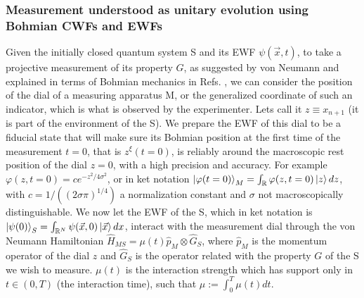 \documentclass[11pt, a4paper]{article} %
\newcommand{\R}{\mathbb{R}} %
\begin{document}

\subsubsection*{Measurement understood as unitary evolution using Bohmian CWFs and EWFs}

Given the initially closed quantum system S and its EWF $\psi(\vec{x},t)$, to take a projective measurement of its property $G$, as suggested by von Neumann \cite{vonNeumann} and explained in terms of Bohmian mechanics in Refs. \cite{Durr, JordiXavier, Holland}, we can consider the position of the dial of a measuring apparatus M, or the generalized coordinate of such an indicator, which is what is observed by the experimenter. Lets call it $z\equiv x_{n+1}$ (it is part of the environment of the S). We prepare the EWF of this dial to be a fiducial state that will make sure its Bohmian position at the first time of the measurement $t=0$, that is $z^\xi(t=0)$, is reliably around the macroscopic rest position of the dial $z=0$, with a high precision and accuracy. For example $\varphi(z,t=0)=c e^{-z^2/4\sigma^2}$, or in ket notation $\ket{\varphi(t=0)}_M=\int_\R\varphi(z,t=0) \ket{z}dz$,  with $c=1/((2\sigma\pi)^{1/4})$ a normalization constant and $\sigma$ not macroscopically distinguishable. We now let the EWF of the S, which in ket notation is $\ket{\psi(0)}_S=\int_{\R^N}\psi(\vec{x},0)\ket{\vec{x}}dx$, interact with the measurement dial through the von Neumann Hamiltonian $\hat{H}_{MS}=\mu(t)\hat{p}_M\otimes \hat{G}_S$, where $\hat{p}_M$ is the momentum operator of the dial $z$ and $\hat{G}_S$ is the operator related with the property $G$ of the S we wish to measure. $\mu(t)$ is the interaction strength which has support only in $t\in(0,T)$ (the interaction time), such that $\mu:=\int_0^T\mu(t)dt$. 
\end{document}
